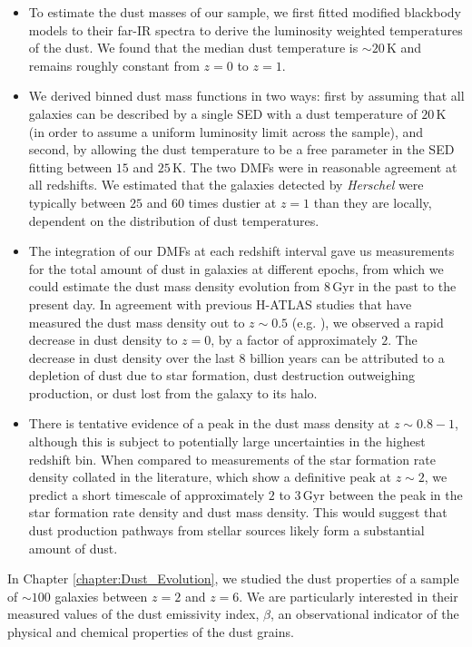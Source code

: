 \begin{itemize}
    \item To estimate the dust masses of our sample, we first fitted modified blackbody models to their far-IR spectra to derive the luminosity weighted temperatures of the dust. We found that the median dust temperature is $\sim20\,$K and remains roughly constant from $z = 0$ to $z = 1$.
    \item We derived binned dust mass functions in two ways: first by assuming that all galaxies can be described by a single SED with a dust temperature of $20\,$K (in order to assume a uniform luminosity limit across the sample), and second, by allowing the dust temperature to be a free parameter in the SED fitting between $15$ and $25\,$K. The two DMFs were in reasonable agreement at all redshifts. We estimated that the galaxies detected by \textit{Herschel} were typically between $25$ and $60$ times dustier at $z = 1$ than they are locally, dependent on the distribution of dust temperatures.
    \item The integration of our DMFs at each redshift interval gave us measurements for the total amount of dust in galaxies at different epochs, from which we could estimate the dust mass density evolution from $8\,$Gyr in the past to the present day. In agreement with previous H-ATLAS studies that have measured the dust mass density out to $z\sim0.5$ (e.g. \citealt{Dunne_2011}), we observed a rapid decrease in dust density to $z = 0$, by a factor of approximately $2$. The decrease in dust density over the last $8$ billion years can be attributed to a depletion of dust due to star formation, dust destruction outweighing production, or dust lost from the galaxy to its halo.
    \item There is tentative evidence of a peak in the dust mass density at $z\sim0.8 - 1$, although this is subject to potentially large uncertainties in the highest redshift bin. When compared to measurements of the star formation rate density collated in the literature, which show a definitive peak at $z\sim2$, we predict a short timescale of approximately $2$ to $3\,$Gyr between the peak in the star formation rate density and dust mass density. This would suggest that dust production pathways from stellar sources likely form a substantial amount of dust.
\end{itemize}

In Chapter \ref{chapter:Dust_Evolution}, we studied the dust properties of a sample of $\sim 100$ galaxies between $z = 2$ and $z = 6$. We are particularly interested in their measured values of the dust emissivity index, $\beta$, an observational indicator of the physical and chemical properties of the dust grains.

